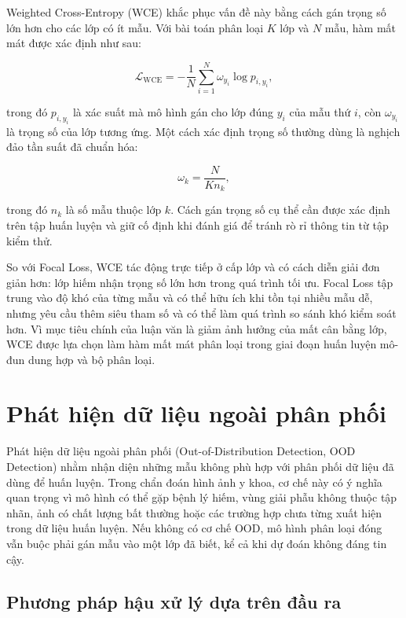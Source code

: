 Weighted Cross-Entropy (WCE) khắc phục vấn đề này bằng cách gán trọng số lớn hơn cho các lớp có ít mẫu. Với bài toán phân loại $K$ lớp và $N$ mẫu, hàm mất mát được xác định như sau:

\begin{equation}
\mathcal{L}_{\mathrm{WCE}}
= -\frac{1}{N}\sum_{i=1}^{N}
\omega_{y_i}\log p_{i,y_i},
\label{eq:wce}
\end{equation}

trong đó $p_{i,y_i}$ là xác suất mà mô hình gán cho lớp đúng $y_i$ của mẫu thứ $i$, còn $\omega_{y_i}$ là trọng số của lớp tương ứng. Một cách xác định trọng số thường dùng là nghịch đảo tần suất đã chuẩn hóa:

\begin{equation}
\omega_k = \frac{N}{K n_k},
\label{eq:wce_weight}
\end{equation}

trong đó $n_k$ là số mẫu thuộc lớp $k$. Cách gán trọng số cụ thể cần được xác định trên tập huấn luyện và giữ cố định khi đánh giá để tránh rò rỉ thông tin từ tập kiểm thử.

So với Focal Loss, WCE tác động trực tiếp ở cấp lớp và có cách diễn giải đơn giản hơn: lớp hiếm nhận trọng số lớn hơn trong quá trình tối ưu. Focal Loss tập trung vào độ khó của từng mẫu và có thể hữu ích khi tồn tại nhiều mẫu dễ, nhưng yêu cầu thêm siêu tham số và có thể làm quá trình so sánh khó kiểm soát hơn. Vì mục tiêu chính của luận văn là giảm ảnh hưởng của mất cân bằng lớp, WCE được lựa chọn làm hàm mất mát phân loại trong giai đoạn huấn luyện mô-đun dung hợp và bộ phân loại.

\section{Phát hiện dữ liệu ngoài phân phối}
\label{sec:ood_related}

Phát hiện dữ liệu ngoài phân phối (Out-of-Distribution Detection, OOD Detection) nhằm nhận diện những mẫu không phù hợp với phân phối dữ liệu đã dùng để huấn luyện. Trong chẩn đoán hình ảnh y khoa, cơ chế này có ý nghĩa quan trọng vì mô hình có thể gặp bệnh lý hiếm, vùng giải phẫu không thuộc tập nhãn, ảnh có chất lượng bất thường hoặc các trường hợp chưa từng xuất hiện trong dữ liệu huấn luyện. Nếu không có cơ chế OOD, mô hình phân loại đóng vẫn buộc phải gán mẫu vào một lớp đã biết, kể cả khi dự đoán không đáng tin cậy.

\subsection{Phương pháp hậu xử lý dựa trên đầu ra}

